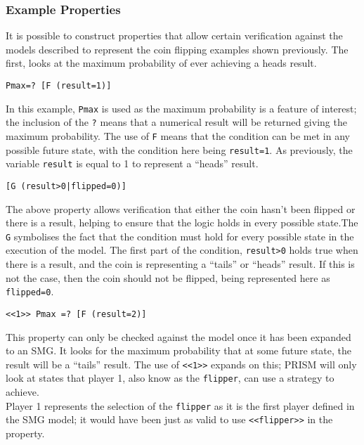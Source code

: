 \documentclass{l4proj}
\begin{document}
\subsubsection{Example Properties}
It is possible to construct properties that allow certain verification against the models described to represent the coin flipping examples shown previously. The first, looks at the maximum probability of ever achieving a heads result.\\

\centerline{\tt Pmax=? [F (result=1)]}

In this example, {\tt Pmax} is used as the maximum probability is a feature of interest; the inclusion of the {\tt ?} means that a numerical result will be returned giving the maximum probability. The use of {\tt F} means that the condition can be met in any possible future state, with the condition here being {\tt result=1}. As previously, the variable {\tt result} is equal to 1 to represent a ``heads'' result.\\

\centerline{\tt [G (result>0|flipped=0)]}

The above property allows verification that either the coin hasn't been flipped or there is a result, helping to ensure that the logic holds in every possible state.The {\tt G} symbolises the fact that the condition must hold for every possible state in the execution of the model. The first part of the condition, {\tt result>0} holds true when there is a result, and the coin is representing a ``tails'' or ``heads'' result. If this is not the case, then the coin should not be flipped, being represented here as {\tt flipped=0}.\\

\centerline{\tt <<1>> Pmax =? [F (result=2)]}

This property can only be checked against the model once it has been expanded to an SMG. It looks for the maximum probability that at some future state, the result will be a ``tails'' result. The use of {\tt <<1>>} expands on this; PRISM will only look at states that player 1, also know as the {\tt flipper}, can use a strategy to achieve.\\
Player 1 represents the selection of the {\tt flipper} as it is the first player defined in the SMG model; it would have been just as valid to use {\tt <<flipper>>} in the property.
\end{document}
